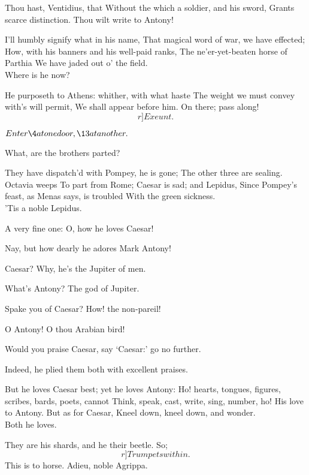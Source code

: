 \documentclass{book}
\begin{document}
	Thou hast, Ventidius, that
	Without the which a soldier, and his sword,
	Grants scarce distinction. Thou wilt write to Antony!

	I'll humbly signify what in his name,
	That magical word of war, we have effected;
	How, with his banners and his well-paid ranks,
	The ne'er-yet-beaten horse of Parthia
	We have jaded out o' the field. \\

	Where is he now?

	He purposeth to Athens: whither, with what haste
	The weight we must convey with's will permit,
	We shall appear before him. On there; pass along!
	\[r]Exeunt.\]





	\(Enter \4 at one door, \13 at another.\)

\4	What, are the brothers parted?

	They have dispatch'd with Pompey, he is gone;
	The other three are sealing. Octavia weeps
	To part from Rome; Caesar is sad; and Lepidus,
	Since Pompey's feast, as Menas says, is troubled
	With the green sickness. \\

\4	'Tis a noble Lepidus.

	A very fine one: O, how he loves Caesar!

\4	Nay, but how dearly he adores Mark Antony!

	Caesar? Why, he's the Jupiter of men.

\4	What's Antony? The god of Jupiter.

	Spake you of Caesar? How! the non-pareil!

\4	O Antony! O thou Arabian bird!

	Would you praise Caesar, say `Caesar:' go no further.

\4	Indeed, he plied them both with excellent praises.

	But he loves Caesar best; yet he loves Antony:
	Ho! hearts, tongues, figures, scribes, bards, poets, cannot
	Think, speak, cast, write, sing, number, ho!
	His love to Antony. But as for Caesar,
	Kneel down, kneel down, and wonder. \\

\4	Both he loves.

	They are his shards, and he their beetle. So;
        \[r]Trumpets within.\]
	This is to horse. Adieu, noble Agrippa.
\end{document}
